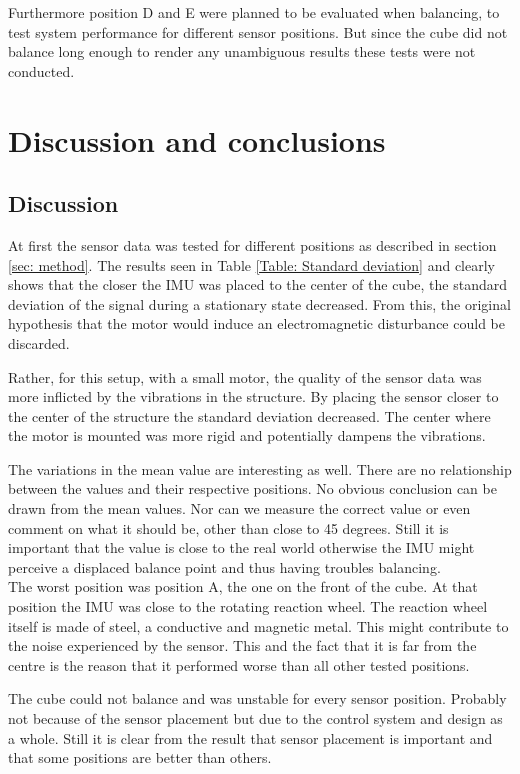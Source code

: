 \documentclass[a4paper,11pt]{kth-mag}
\begin{document}
Furthermore position D and E were planned to be evaluated when balancing, to test system performance for different sensor positions. But since the cube did not balance long enough to render any unambiguous results these tests were not conducted.

\chapter{Discussion and conclusions}

\section{Discussion}
At first the sensor data was tested for different positions as described in section \ref{sec: method}. The results seen in Table \ref{Table: Standard deviation} and clearly shows that the closer the IMU was placed to the center of the cube, the standard deviation of the signal during a stationary state decreased. From this, the original hypothesis that the motor would induce an electromagnetic disturbance could be discarded.

Rather, for this setup, with a small motor, the quality of the sensor data was more inflicted by the vibrations in the structure. By placing the sensor closer to the center of the structure the standard deviation decreased. The center where the motor is mounted was more rigid and potentially dampens the vibrations.

The variations in the mean value are interesting as well. There are no relationship between the values and their respective positions. No obvious conclusion can be drawn from the mean values. Nor can we measure the correct value or even comment on what it should be, other than close to 45 degrees. Still it is important that the value is close to the real world otherwise the IMU might perceive a displaced balance point and thus having troubles balancing.
\\ 

The worst position was position A, the one on the front of the cube. At that position the IMU was close to the rotating reaction wheel. The reaction wheel itself is made of steel, a conductive and magnetic metal. This might contribute to the noise experienced by the sensor. This and the fact that it is far from the centre is the reason that it performed worse than all other tested positions.

The cube could not balance and was unstable for every sensor position. Probably not because of the sensor placement but due to the control system and design as a whole. Still it is clear from the result that sensor placement is important and that some positions are better than others.
\end{document}
